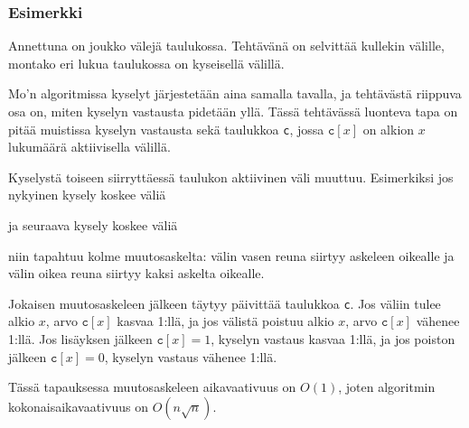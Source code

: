\subsubsection*{Esimerkki}

\begin{task}
Annettuna on joukko välejä taulukossa.
Tehtävänä on selvittää kullekin välille,
montako eri lukua taulukossa on kyseisellä välillä.
\end{task}

Mo'n algoritmissa kyselyt järjestetään aina samalla
tavalla, ja tehtävästä riippuva osa on,
miten kyselyn vastausta pidetään yllä.
Tässä tehtävässä luonteva tapa on
pitää muistissa kyselyn vastausta sekä
taulukkoa \texttt{c}, jossa $\texttt{c}[x]$
on alkion $x$ lukumäärä aktiivisella välillä.

Kyselystä toiseen siirryttäessä taulukon aktiivinen
väli muuttuu. Esimerkiksi jos nykyinen kysely koskee väliä

\begin{center}
\end{center}

ja seuraava kysely koskee väliä

\begin{center}
\end{center}

niin tapahtuu kolme muutosaskelta:
välin vasen reuna siirtyy askeleen oikealle
ja välin oikea reuna siirtyy kaksi askelta oikealle.

Jokaisen muutosaskeleen jälkeen täytyy
päivittää taulukkoa \texttt{c}.
Jos väliin tulee alkio $x$,
arvo $\texttt{c}[x]$ kasvaa 1:llä,
ja jos välistä poistuu alkio $x$,
arvo $\texttt{c}[x]$ vähenee 1:llä.
Jos lisäyksen jälkeen $\texttt{c}[x]=1$,
kyselyn vastaus kasvaa 1:llä,
ja jos poiston jälkeen $\texttt{c}[x]=0$,
kyselyn vastaus vähenee 1:llä.

Tässä tapauksessa muutosaskeleen aikavaativuus on $O(1)$,
joten algoritmin kokonaisaikavaativuus on $O(n \sqrt n)$.


